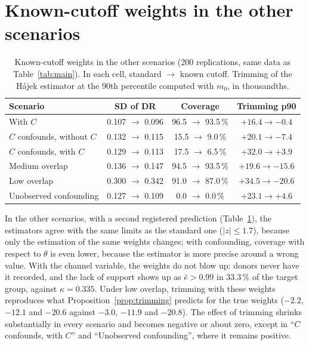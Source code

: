 \section{Known-cutoff weights in the other scenarios}\label{app:extra}

\begin{table}[ht]
\centering\small
\caption{Known-cutoff weights in the other scenarios (200 replications, same data as Table~\ref{tab:main}). In each cell, standard $\to$ known cutoff. Trimming of the Hájek estimator at the 90th percentile computed with $m_0$, in thousandths.}\label{tab:cutoff-scenarios}
\begin{tabular}{@{}lccc@{}}
\toprule
Scenario & SD of DR & Coverage & Trimming p90 \\
\midrule
With $C$ & 0.107 $\to$ 0.096 & 96.5 $\to$ 93.5\,\% & $+16.4\to-0.4$ \\
$C$ confounds, without $C$ & 0.132 $\to$ 0.115 & 15.5 $\to$ 9.0\,\% & $+20.1\to-7.4$ \\
$C$ confounds, with $C$ & 0.129 $\to$ 0.113 & 17.5 $\to$ 6.5\,\% & $+32.0\to+3.9$ \\
Medium overlap & 0.136 $\to$ 0.147 & 94.5 $\to$ 93.5\,\% & $+19.6\to-15.6$ \\
Low overlap & 0.300 $\to$ 0.342 & 91.0 $\to$ 87.0\,\% & $+34.5\to-20.6$ \\
Unobserved confounding & 0.127 $\to$ 0.109 & 0.0 $\to$ 0.0\,\% & $+23.1\to+4.6$ \\
\bottomrule
\end{tabular}
\end{table}

In the other scenarios, with a second registered prediction (Table~\ref{tab:cutoff-scenarios}), the estimators agree with the same limits as the standard one ($|z|\le1.7$), because only the estimation of the same weights changes; with confounding, coverage with respect to $\theta$ is even lower, because the estimator is more precise around a wrong value. With the channel variable, the weights do not blow up: donors never have it recorded, and the lack of support shows up as $\hat e>0.99$ in 33.3\,\% of the target group, against $\kappa=0.335$. Under low overlap, trimming with these weights reproduces what Proposition~\ref{prop:trimming} predicts for the true weights ($-2.2$, $-12.1$ and $-20.6$ against $-3.0$, $-11.9$ and $-20.8$). The effect of trimming shrinks substantially in every scenario and becomes negative or about zero, except in ``$C$ confounds, with $C$'' and ``Unobserved confounding'', where it remains positive.

